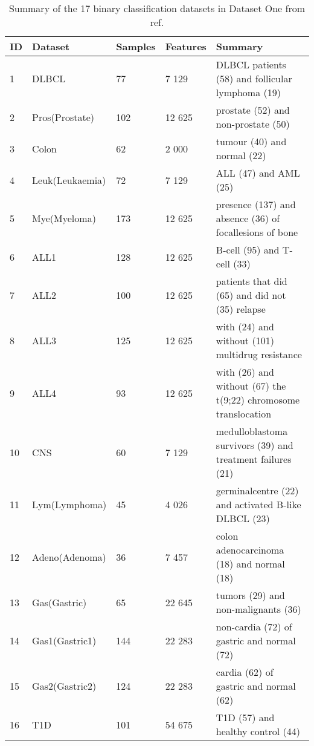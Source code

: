 \documentclass[10pt,journal,compsoc]{IEEEtran}
\begin{document}
	\begin{table*}[htp] \scriptsize
	\centering\caption{Summary of the 17 binary classification datasets in Dataset One from ref. \cite{W16}}
	\resizebox{1\textwidth}{!}
	   {\begin{threeparttable}
	   \label{Tab:dataset 1}
	   \begin{tabular}{lllll}
	       \toprule
	       ID & Dataset & Samples & Features & Summary\\
	       \midrule
	       1 & DLBCL\tnote{1} & 77 & 7 129 & DLBCL patients (58) and follicular lymphoma (19)\\
	       2 & Pros(Prostate)\tnote{1} & 102 & 12 625 & prostate (52) and non-prostate (50)\\
	       3 & Colon\tnote{2} & 62 & 2 000 & tumour (40) and normal (22)\\
	       4 & Leuk(Leukaemia)\tnote{2} & 72 & 7 129 & ALL (47) and AML (25)\\
	       5 & Mye(Myeloma)\tnote{3} & 173 & 12 625 & presence (137) and absence (36) of focallesions of bone\\
	       6 & ALL1\tnote{1} & 128 & 12 625 & B-cell (95) and T-cell (33)\\
	       7 & ALL2\tnote{1} & 100 & 12 625 & patients that did (65) and did not (35) relapse\\
	       8 & ALL3\tnote{1} & 125 & 12 625 & with (24) and without (101) multidrug resistance\\
	       9 & ALL4\tnote{1} & 93 & 12 625 & with (26) and without (67) the t(9;22) chromosome translocation\\
	       10 & CNS\tnote{1} & 60 & 7 129 & medulloblastoma survivors (39) and treatment failures (21)\\
	       11 & Lym(Lymphoma)\tnote{1} & 45 & 4 026 & germinalcentre (22) and activated B-like DLBCL (23)\\
	       12 & Adeno(Adenoma)\tnote{1} & 36 & 7 457 & colon adenocarcinoma (18) and normal (18)\\
	       13 & Gas(Gastric)\tnote{3} & 65 & 22 645 & tumors (29) and non-malignants (36)\\
	       14 & Gas1(Gastric1)\tnote{3} & 144 & 22 283 & non-cardia (72) of gastric and normal (72)\\
	       15 & Gas2(Gastric2)\tnote{3} & 124 & 22 283 & cardia (62) of gastric and normal (62)\\
	       16 & T1D\tnote{3} & 101 & 54 675 & T1D (57) and healthy control (44)\\

\end{tabular}
\end{threeparttable}}
\end{table*}
\end{document}
